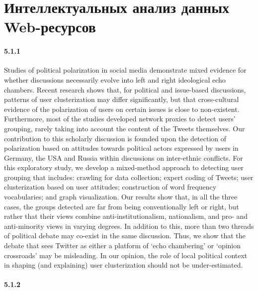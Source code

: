 \chapter{Интеллектуальных анализ данных Web-ресурсов}\label{ch:ch5}

\subsubsection{5.1.1}

Studies of political polarization in social media demonstrate mixed evidence for whether discussions necessarily evolve into left and right ideological echo chambers. Recent research shows that, for political and issue-based discussions, patterns of user clusterization may differ significantly, but that cross-cultural evidence of the polarization of users on certain issues is close to non-existent. Furthermore, most of the studies developed network proxies to detect users’ grouping, rarely taking into account the content of the Tweets themselves. Our contribution to this scholarly discussion is founded upon the detection of polarization based on attitudes towards political actors expressed by users in Germany, the USA and Russia within discussions on inter-ethnic conflicts. For this exploratory study, we develop a mixed-method approach to detecting user grouping that includes: crawling for data collection; expert coding of Tweets; user clusterization based on user attitudes; construction of word frequency vocabularies; and graph visualization. Our results show that, in all the three cases, the groups detected are far from being conventionally left or right, but rather that their views combine anti-institutionalism, nationalism, and pro- and anti-minority views in varying degrees. In addition to this, more than two threads of political debate may co-exist in the same discussion. Thus, we show that the debate that sees Twitter as either a platform of ‘echo chambering’ or ‘opinion crossroads’ may be misleading. In our opinion, the role of local political context in shaping (and explaining) user clusterization should not be under-estimated.

\subsubsection{5.1.2}

